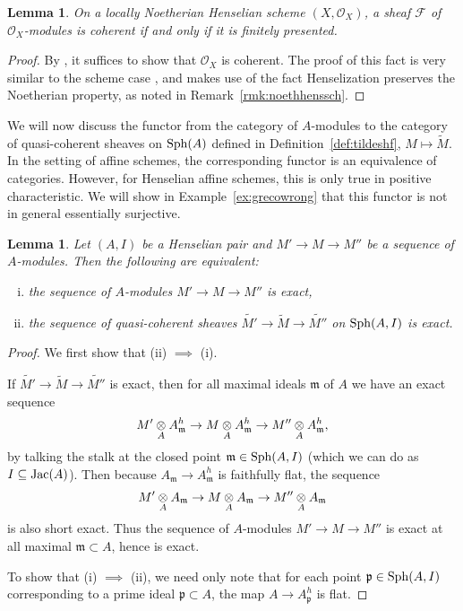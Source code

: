\documentclass[12pt]{article}
\renewcommand{\O}{\mathscr{O}}
\newcommand{\F}{\mathcal{F}}
\newcommand{\sph}{{\rm Sph}}
\newcommand{\mf}[1]{\mathfrak{#1}}
\newcommand{\spcite}[2]{\cite[\href{https://stacks.math.columbia.edu/tag/#1}{{#2} {#1}}]{stackp}}
\newtheorem{lemma}[theorem]{Lemma}
\theoremstyle{definition}
\numberwithin{equation}{subsection}
\begin{document}
\begin{lemma}\label{lem:cohfpres} On a locally Noetherian Henselian scheme $(X,\O_X)$, a sheaf $\F$ of $\O_X$-modules is coherent if and only if it is finitely presented.
\end{lemma}
\begin{proof} By \spcite{01BZ}{Lemma}, it suffices to show that $\O_X$ is coherent. The proof of this fact is very similar to the scheme case \spcite{01XZ}{Lemma}, and makes use of the fact Henselization preserves the Noetherian property, as noted in Remark~\ref{rmk:noethhenssch}.\end{proof}



We will now discuss the functor from the category of $A$-modules to the category of quasi-coherent sheaves on $\sph(A)$ defined in Definition~\ref{def:tildeshf}, $M \mapsto \widetilde{M}$. In the setting of affine schemes, the corresponding functor is an equivalence of categories. However, for Henselian affine schemes, this is only true in positive characteristic. We will show in Example~\ref{ex:grecowrong} that this functor is not in general essentially surjective. 

\begin{lemma}\label{lem:tildeexact} Let $(A,I)$ be a Henselian pair and $M' \to M \to M''$ be a sequence of $A$-modules. Then the following are equivalent:
\begin{enumerate}[(i)]
\item the sequence of $A$-modules $M' \to M \to M''$ is exact, \item the sequence of quasi-coherent sheaves $\widetilde{M'} \to \widetilde{M} \to \widetilde{M''}$ on $\sph(A,I)$ is exact.
 \end{enumerate}
\end{lemma}
\begin{proof} 
We first show that (ii) $\implies$ (i). 

If $\widetilde{M'} \to \widetilde{M} \to \widetilde{M''}$ is exact, then for all maximal ideals $\mf{m}$ of $A$ we have an exact sequence $$M' \tens_A A_{\mf{m}}^h \to M \tens_A A_{\mf{m}}^h  \to M''\tens_A A_{\mf{m}}^h,$$ by talking the stalk at the closed point $\mf{m} \in \sph(A,I)$ (which we can do as $I \subseteq {\rm Jac}(A)$). Then because $A_{\mf{m}} \to A_{\mf{m}}^h$ is faithfully flat, the sequence $$M' \tens_A A_{\mf{m}} \to  M\tens_A A_{\mf{m}}  \to M''\tens_A A_{\mf{m}}$$ is also short exact. Thus the sequence of $A$-modules $M' \to M \to M''$ is exact at all maximal $\mf{m} \subset A$, hence is exact.

To show that (i) $\implies$ (ii), we need only note that for each point $\mf{p} \in \sph(A,I)$ corresponding to a prime ideal $\mf{p} \subset A$, the map $A \to A_{\mf{p}}^h$ is flat. \end{proof}
\end{document}
